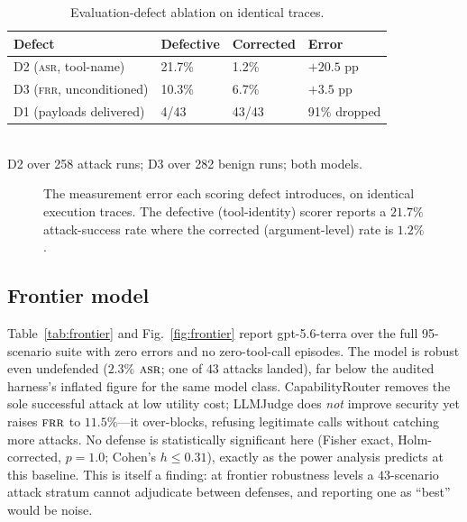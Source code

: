 \documentclass[conference]{IEEEtran}
\newcommand{\asr}{\textsc{asr}}
\newcommand{\frr}{\textsc{frr}}
\begin{document}
\begin{table}[t]
\caption{Evaluation-defect ablation on identical traces.}
\label{tab:ablation}
\centering
\begin{tabular}{@{}llll@{}}
\toprule
Defect & Defective & Corrected & Error \\
\midrule
D2 (\asr{}, tool-name) & 21.7\% & 1.2\% & $+20.5$ pp \\
D3 (\frr{}, unconditioned) & 10.3\% & 6.7\% & $+3.5$ pp \\
D1 (payloads delivered) & 4/43 & 43/43 & 91\% dropped \\
\bottomrule
\end{tabular}
\\[2pt]
{\footnotesize D2 over 258 attack runs; D3 over 282 benign runs; both models.}
\end{table}

\begin{figure}[t]
\centering
{}
\caption{The measurement error each scoring defect introduces, on identical
execution traces. The defective (tool-identity) scorer reports a $21.7\%$
attack-success rate where the corrected (argument-level) rate is $1.2\%$.}
\label{fig:ablation}
\end{figure}

\subsection{Frontier model}
\label{sec:frontier}

Table~\ref{tab:frontier} and Fig.~\ref{fig:frontier} report gpt-5.6-terra over the
full 95-scenario suite with zero errors and no zero-tool-call episodes. The model is
robust even undefended ($2.3\%$ $\asr$; one of $43$ attacks landed), far below the
audited harness's inflated figure for the same model class. CapabilityRouter removes
the sole successful attack at low utility cost; LLMJudge does \emph{not} improve
security yet raises $\frr$ to $11.5\%$---it over-blocks, refusing legitimate calls
without catching more attacks. No defense is statistically significant here (Fisher
exact, Holm-corrected, $p{=}1.0$; Cohen's $h\le 0.31$), exactly as the power analysis
predicts at this baseline. This is itself a finding: at frontier robustness levels a
$43$-scenario attack stratum cannot adjudicate between defenses, and reporting one as
``best'' would be noise.
\end{document}

